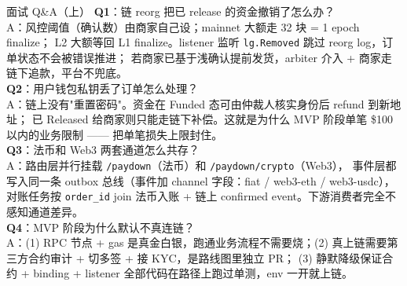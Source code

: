 \documentclass[aspectratio=169,11pt]{beamer}
\begin{document}
\begin{frame}[shrink]{面试 Q\&A（上）}
\textbf{Q1}：链 reorg 把已 release 的资金撤销了怎么办？\\
\hspace{4mm}\small A：风控阈值（确认数）由商家自己设；mainnet 大额走 32 块 = 1 epoch finalize；
L2 大额等回 L1 finalize。listener 监听 \texttt{lg.Removed} 跳过 reorg log，订单状态不会被错误推进；
若商家已基于浅确认提前发货，arbiter 介入 + 商家走链下追款，平台不兜底。\\

\vspace{1.5mm}
\textbf{Q2}：用户钱包私钥丢了订单怎么处理？\\
\hspace{4mm}\small A：链上没有"重置密码"。资金在 Funded 态可由仲裁人核实身份后 refund 到新地址；
已 Released 给商家则只能走链下补偿。这就是为什么 MVP 阶段单笔 \$100 以内的业务限制 —— 把单笔损失上限封住。\\

\vspace{1.5mm}
\textbf{Q3}：法币和 Web3 两套通道怎么共存？\\
\hspace{4mm}\small A：路由层并行挂载 \texttt{/paydown}（法币）和 \texttt{/paydown/crypto}（Web3），
事件层都写入同一条 outbox 总线（事件加 channel 字段：fiat / web3-eth / web3-usdc），
对账任务按 \texttt{order\_id} join 法币入账 + 链上 confirmed event。下游消费者完全不感知通道差异。\\

\vspace{1.5mm}
\textbf{Q4}：MVP 阶段为什么默认不真连链？\\
\hspace{4mm}\small A：(1) RPC 节点 + gas 是真金白银，跑通业务流程不需要烧；(2) 真上链需要第三方合约审计 + 切多签 + 接 KYC，是路线图里独立 PR；
(3) 静默降级保证合约 + binding + listener 全部代码在路径上跑过单测，env 一开就上链。\\
\end{frame}
\end{document}
